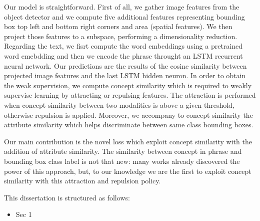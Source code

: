 Our model is straightforward. First of all, we gather image features
from the object detector and we compute five additional features
representing bounding box top left and bottom right corners and area
(spatial features). We then project those features to a subspace,
performing a dimensionality reduction. Regarding the text, we fisrt
compute the word embeddings using a pretrained word emebdding and then
we encode the phrase throught an LSTM recurrent neural network. Our
predictions are the results of the cosine similarity between projected
image features and the last LSTM hidden neuron. In order to obtain the
weak supervision, we compute concept similarity which is required to
weakly supervise learning by attracting or repulsing features. The
attraction is performed when concept similarity between two modalities
is above a given threshold, otherwise repulsion is applied. Moreover,
we accompany to concept similarity the attribute similarity which
helps discriminate between same class bounding boxes. 

Our main contribution is the novel loss which exploit concept
similarity with the addition of attribute similarity. The similarity
between concept in phrase and bounding box class label is not that
new: many works already discovered the power of this approach, but, to
our knowledge we are the first to exploit concept similarity with this
attraction and repulsion policy. 

This dissertation is structured as follows:
\begin{itemize}
    \item Sec 1
\end{itemize}
